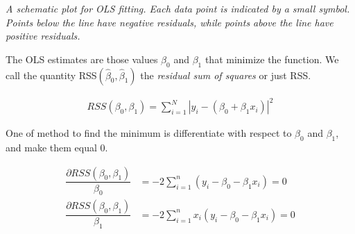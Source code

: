 \documentclass{article}
\begin{document}
    \begin{center}
        \pgfplotsset{compat=newest}
        
        \textit{A schematic plot for OLS fitting. Each data point is indicated by a small symbol. Points below the line have negative residuals, while points above the line have positive residuals.}
    \end{center}
    
    The OLS estimates are those values ${\beta_{0}}$ and ${\beta_{1}}$ that minimize the function. We call the quantity RSS${ \left (\hat{\beta}_{0},{\hat{\beta}_{1}} \right)}$ the \textit{residual sum of squares} or just RSS.
    
    \begin{align}
        RSS(\beta_{0}, \beta_{1}) = \displaystyle \sum _{i = 1} ^ {N}   |y_{i} - (\beta_{0} + \beta_{1} x_{i})| ^ 2 \nonumber 
     \end{align}
    
    One of method to find the minimum is differentiate with respect to $\beta_{0}$ and $\beta_{1}$, and make them equal $0$. 
     
    \begin{align} 
        \label {eq RSS B0}
        \dfrac{\partial RSS(\beta_{0}, \beta_{1}) }{\beta_{0}} &= -2 \displaystyle \sum _{i=1}^{n}  (y_{i} - \beta_{0} - \beta_{1} x_{i}) = 0
        \\
        \label {eq RSS B1}
        \dfrac{\partial RSS(\beta_{0}, \beta_{1}) }{\beta_{1}} &= -2 \displaystyle \sum _{i=1}^{n}  x_{i} (y_{i} - \beta_{0} - \beta_{1} x_{i}) = 0
    \end{align}
        
\end{document}
